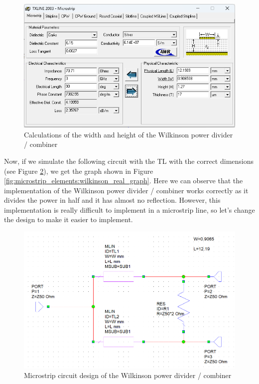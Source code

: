 \documentclass[12pt]{report} %
\begin{document}
\begin{figure}[htbp]
    \centering
    \includegraphics[width=1\linewidth]{images//microstrip_elements/wilkinson_real_txline_tool_calculations.png}
    \caption{Calculations of the width and height of the Wilkinson power divider / combiner}
    \label{fig:microstrip_elements:wilkinson_real_txline_tool_calculations}
\end{figure}

Now, if we simulate the following circuit with the TL with the correct dimensions (see Figure \ref{fig:microstrip_elements:wilkinson_real_circuit}), we get the graph shown in Figure \ref{fig:microstrip_elements:wilkinson_real_graph}.
Here we can observe that the implementation of the Wilkinson power divider / combiner works correctly as it divides the power in half and it has almost no reflection. However, this implementation is really difficult to implement in a microstrip line, so let's change the design to make it easier to implement.

\begin{figure}[htbp]
    \centering
    \includegraphics[width=1\linewidth]{images//microstrip_elements/wilkinson_real_circuit.png}
    \caption{Microstrip circuit design of the Wilkinson power divider / combiner}
    \label{fig:microstrip_elements:wilkinson_real_circuit}
\end{figure}
\end{document}
